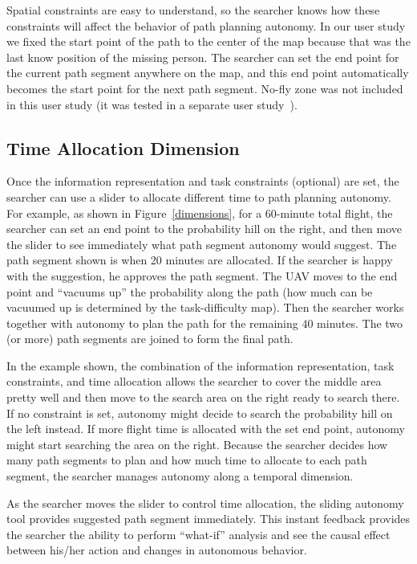 \documentclass[lettersize, apacite, twoside, HRI]{apa_HRI}
\begin{document}
Spatial constraints are easy to understand, so the searcher knows how these constraints will affect the behavior of path planning autonomy. In our user study we fixed the start point of the path to the center of the map because that was the last know position of the missing person. The searcher can set the end point for the current path segment anywhere on the map, and this end point automatically becomes the start point for the next path segment. No-fly zone was not included in this user study (it was tested in a separate user study~\cite{Clark2013Hierarchical}).

\subsection{Time Allocation Dimension}

Once the information representation and task constraints (optional) are set, the searcher can use a slider to allocate different time to path planning autonomy. For example, as shown in Figure~\ref{dimensions}, for a 60-minute total flight, the searcher can set an end point to the probability hill on the right, and then move the slider to see immediately what path segment autonomy would suggest. The path segment shown is when 20 minutes are allocated. If the searcher is happy with the suggestion, he approves the path segment. The UAV moves to the end point and ``vacuums up'' the probability along the path (how much can be vacuumed up is determined by the task-difficulty map). Then the searcher works together with autonomy to plan the path for the remaining 40 minutes. The two (or more) path segments are joined to form the final path. 

In the example shown, the combination of the information representation, task constraints, and time allocation allows the searcher to cover the middle area pretty well and then move to the search area on the right ready to search there. If no constraint is set, autonomy might decide to search the probability hill on the left instead. If more flight time is allocated with the set end point, autonomy might start searching the area on the right. Because the searcher decides how many path segments to plan and how much time to allocate to each path segment, the searcher manages autonomy along a temporal dimension.

As the searcher moves the slider to control time allocation, the sliding autonomy tool provides suggested path segment immediately. This instant feedback provides the searcher the ability to perform ``what-if'' analysis and see the causal effect between his/her action and changes in autonomous behavior. 
\end{document}
